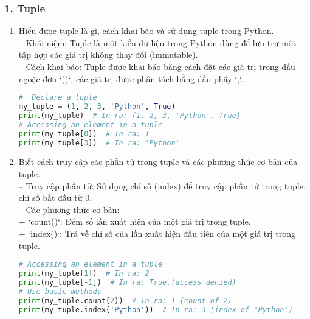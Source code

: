 \subsubsection*{1. Tuple}
\begin{enumerate}[label=\alph*.]
    \item Hiểu được tuple là gì, cách khai báo và sử dụng tuple trong Python.\\
    -- Khái niệm: Tuple là một kiểu dữ liệu trong Python dùng để lưu trữ một tập hợp các giá trị không thay đổi (immutable).\\
    -- Cách khai báo: Tuple được khai báo bằng cách đặt các giá trị trong dấu ngoặc đơn `()`, các giá trị được phân tách bằng dấu phẩy `,`.
    \begin{lstlisting}[language=Python]
#  Declare a tuple
my_tuple = (1, 2, 3, 'Python', True)
print(my_tuple)  # In ra: (1, 2, 3, 'Python', True)
# Accessing an element in a tuple
print(my_tuple[0])  # In ra: 1
print(my_tuple[3])  # In ra: 'Python'
    \end{lstlisting}
    \vspace{-4.5em}
    \item Biết cách truy cập các phần tử trong tuple và các phương thức cơ bản của tuple.\\
    -- Truy cập phần tử: Sử dụng chỉ số (index) để truy cập phần tử trong tuple, chỉ số bắt đầu từ 0.\\
    -- Các phương thức cơ bản:\\
        + `count()`: Đếm số lần xuất hiện của một giá trị trong tuple.\\
        + `index()`: Trả về chỉ số của lần xuất hiện đầu tiên của một giá trị trong tuple.
    \begin{lstlisting}[language=Python]
# Accessing an element in a tuple
print(my_tuple[1])  # In ra: 2
print(my_tuple[-1])  # In ra: True.(access denied)
# Use basic methods
print(my_tuple.count(2))  # In ra: 1 (count of 2)
print(my_tuple.index('Python'))  # In ra: 3 (index of 'Python')
    \end{lstlisting}
\end{enumerate}
\vspace*{-6.5em}
